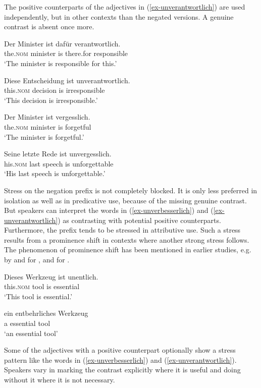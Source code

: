 \documentclass[output=paper
  ,nobabel
  ,draftmode
  ,colorlinks, citecolor=brown
]{langscibook}
\begin{document}
\noindent The positive counterparts of the adjectives in (\ref{ex-unverantwortlich}) are used independently, but in other contexts than the negated versions. A genuine contrast is absent once more.

\eal
\ex
\gll Der              Minister ist dafür     verantwortlich. \\
     the.\textsc{nom} minister is  there.for responsible \\
\glt `The minister is responsible for this.'

\ex
\gll Diese Entscheidung ist unverantwortlich. \\
	this.\textsc{nom} decision is irresponsible\\
\glt `This decision is irresponsible.'
\zl


\eal
\ex
\gll Der Minister ist vergesslich. \\
	the.\textsc{nom} minister is forgetful\\
\glt `The minister is forgetful.'

\ex
\gll Seine letzte Rede ist unvergesslich. \\
	his.\textsc{nom} last speech is unforgettable\\
\glt `His last speech is unforgettable.'
\zl

\noindent Stress on the negation prefix is not completely blocked. It is only less preferred in isolation as well as in predicative use, because of the missing genuine contrast. But speakers can interpret the words in (\ref{ex-unverbesserlich}) and (\ref{ex-unverantwortlich}) as contrasting with potential positive counterparts. Furthermore, the prefix tends to be stressed in attributive use. Such a stress results from a prominence shift in contexts where another strong stress follows. The phenomenon of prominence shift has been mentioned in earlier studies, e.g. by \citet{ChomskyHalle1968} and \citet{Selkirk1995} for , and \citet{Wiese1996} for .

\eal
\ex
\gll Dieses Werkzeug ist unentlich. \\
this.\textsc{nom} tool is essential \\
\glt `This tool is essential.'

\ex
\gll ein entbehrliches Werkzeug \\
	a essential tool\\
\glt `an essential tool'
\zl

\largerpage
\noindent 
Some of the adjectives with a positive counterpart optionally show a stress pattern like the words in (\ref{ex-unverbesserlich}) and (\ref{ex-unverantwortlich}). Speakers vary in marking the contrast explicitly where it is useful and doing without it where it is not necessary. 
\end{document}
